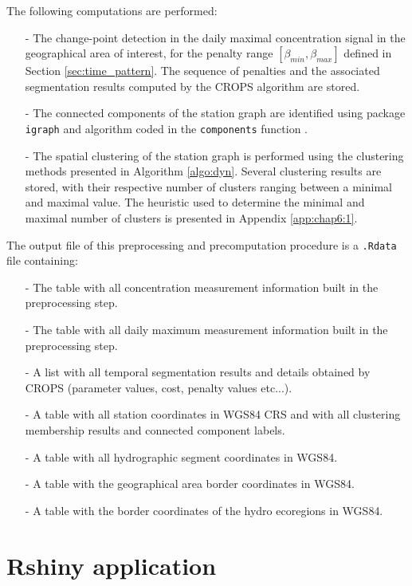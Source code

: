 The following computations are performed:
\begin{itemize}
\item[-] The change-point detection in the daily maximal concentration signal in the geographical area of interest, for the penalty range $[\beta_{min},\beta_{max}]$ defined in Section \ref{sec:time_pattern}. The sequence of penalties and the associated segmentation results computed by the CROPS algorithm are stored.
\item[-] The connected components of the station graph are identified using package \texttt{igraph} and algorithm coded in the \texttt{components} function \citep{Hopcroft1973}. 
\item[-] The spatial clustering of the station graph is performed using the clustering methods presented in Algorithm \ref{algo:dyn}. Several clustering results are stored, with their respective number of clusters ranging between a minimal and maximal value. The heuristic used to determine the minimal and maximal number of clusters is presented in Appendix \ref{app:chap6:1}.
\end{itemize}

The output file of this preprocessing and precomputation procedure is a \texttt{.Rdata} file containing: 
\begin{itemize}
\item[-] The table with all concentration measurement information built in the preprocessing step.
\item[-] The table with all daily maximum measurement information built in the preprocessing step.
\item[-] A list with all temporal segmentation results and details obtained by CROPS (parameter values, cost, penalty values etc...).
\item[-] A table with all station coordinates in WGS84 CRS and with all clustering membership results and connected component labels. 
\item[-] A table with all hydrographic segment coordinates in WGS84. 
\item[-] A table with the geographical area border coordinates in WGS84.
\item[-] A table with the border coordinates of the hydro ecoregions in WGS84.
\end{itemize}


\section{Rshiny application}\label{chp:6:2}

